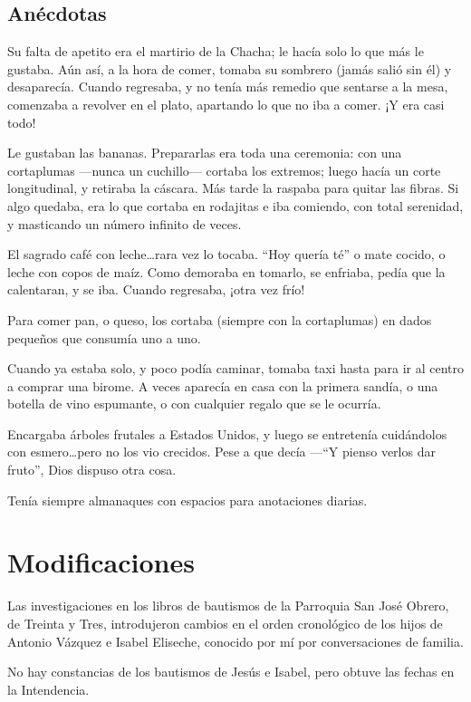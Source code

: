 \documentclass[a4paper]{article}
\begin{document}
\subsection{Anécdotas}

Su falta de apetito era el martirio de la Chacha; le hacía solo lo que más le gustaba. Aún así, a la hora de comer, tomaba su sombrero (jamás salió sin él) y desaparecía. Cuando regresaba, y no tenía más remedio que sentarse a la mesa, comenzaba a revolver en el plato, apartando lo que no iba a comer. ¡Y era casi todo!

Le gustaban las bananas. Prepararlas era toda una ceremonia: con una cortaplumas ---nunca un cuchillo--- cortaba los extremos; luego hacía un corte longitudinal, y retiraba la cáscara. Más tarde la raspaba para quitar las fibras. Si algo quedaba, era lo que cortaba en rodajitas e iba comiendo, con total serenidad, y masticando un número infinito de veces.

El sagrado café con leche\ldots rara vez lo tocaba. ``Hoy quería té'' o mate cocido, o leche con copos de maíz. Como demoraba en tomarlo, se enfriaba, pedía que la calentaran, y se iba. Cuando regresaba, ¡otra vez frío!

Para comer pan, o queso, los cortaba (siempre con la cortaplumas) en dados pequeños que consumía uno a uno.

Cuando ya estaba solo, y poco podía caminar, tomaba taxi hasta para ir al centro a comprar una birome. A veces aparecía en casa con la primera sandía, o una botella de vino espumante, o con cualquier regalo que se le ocurría.

Encargaba árboles frutales a Estados Unidos, y luego se entretenía cuidándolos con esmero\ldots pero no los vio crecidos. Pese a que decía ---``Y pienso verlos dar fruto'', Dios dispuso otra cosa.

Tenía siempre almanaques con espacios para anotaciones diarias.

\section{Modificaciones}

Las investigaciones en los libros de bautismos de la Parroquia San José Obrero, de Treinta y Tres, introdujeron cambios en el orden cronológico de los hijos de Antonio Vázquez e Isabel Eliseche, conocido por mí por conversaciones de familia.

No hay constancias de los bautismos de Jesús e Isabel, pero obtuve las fechas en la Intendencia.
\end{document}
